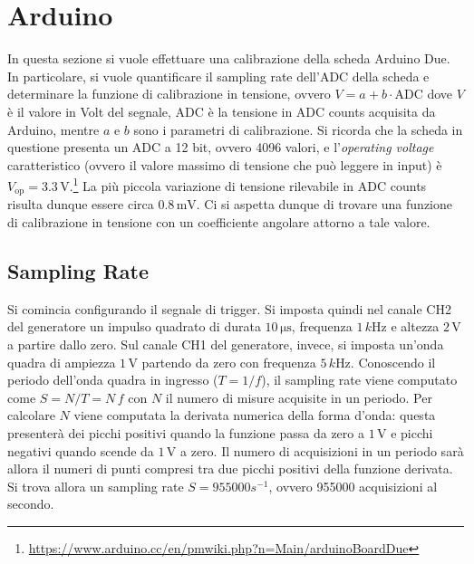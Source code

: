 \documentclass[a4paper,11pt]{article} %
\begin{document}
\section{Arduino}
In questa sezione si vuole effettuare una calibrazione della scheda Arduino Due. In particolare, si vuole quantificare
il sampling rate dell'ADC della scheda e determinare la funzione di calibrazione in tensione, ovvero $V = a + b \cdot
\text{ADC}$ dove $V$ è il valore in Volt del segnale, $\text{ADC}$ è la tensione in ADC counts acquisita da Arduino,
mentre $a$ e $b$ sono i parametri di calibrazione. Si ricorda che la scheda in questione presenta un ADC a 12 bit,
ovvero 4096 valori, e l'\textit{operating voltage} caratteristico (ovvero il valore massimo di tensione che può leggere
in input) è $V_{\text{op}}=3.3\,\si{\volt}$.\footnote{\url{https://www.arduino.cc/en/pmwiki.php?n=Main/arduinoBoardDue}}
La più piccola variazione di tensione rilevabile in ADC counts risulta dunque essere circa $0.8\,\si{\mV}$. Ci si
aspetta dunque di trovare una funzione di calibrazione in tensione con un coefficiente angolare attorno a tale valore. 


\subsection{Sampling Rate}
Si comincia configurando il segnale di trigger. Si imposta quindi nel canale CH2 del generatore un impulso quadrato di
durata $10\,\si{\us}$, frequenza $1\,\si{k\hertz}$ e altezza $2\,\si{\volt}$ a partire dallo zero. Sul canale CH1 del
generatore, invece, si imposta un'onda quadra di ampiezza $1\,\si{\volt}$ partendo da zero con frequenza
$5\,\si{k\hertz}$. Conoscendo il periodo dell'onda quadra in ingresso ($T=1/f$), il sampling rate viene computato come
$S = N / T = N \, f$ con $N$ il numero di misure acquisite in un periodo. Per calcolare $N$ viene computata la derivata
numerica della forma d'onda: questa presenterà dei picchi positivi quando la funzione passa da zero a $1\,\si{\volt}$ e
picchi negativi quando scende da $1\,\si{\volt}$ a zero. Il numero di acquisizioni in un periodo sarà allora il numeri
di punti compresi tra due picchi positivi della funzione derivata. Si trova allora un sampling rate $S = 955000 s^{-1}$,
ovvero 955000 acquisizioni al secondo.
\end{document}
